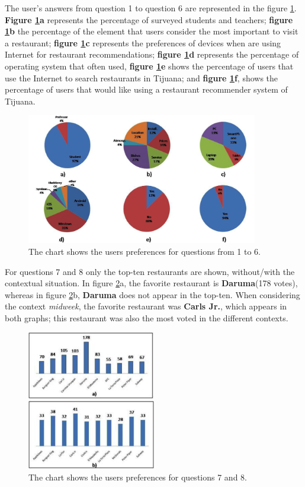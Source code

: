 The user's answers from question 1 to question 6 are represented in
the figure \ref{fig:cakeschart}. \textbf{Figure \ref{fig:cakeschart}a}
represents the percentage of surveyed students and teachers;
\textbf{figure \ref{fig:cakeschart}b}  the percentage of the element
that users consider the most important to visit a restaurant;
\textbf{figure \ref{fig:cakeschart}c} represents the preferences of
devices when are using Internet for restaurant recommendations;
\textbf{figure \ref{fig:cakeschart}d} represents the percentage of
operating system that often used, \textbf{figure
\ref{fig:cakeschart}e} shows the percentage of users that use the
Internet to search restaurants in Tijuana; and \textbf{figure
\ref{fig:cakeschart}f}, shows the percentage of users that would like
using a restaurant recommender system of Tijuana.
\begin{figure}
\captionsetup{justification=centering,margin=2cm}
\centering
\setlength\fboxsep{0pt}
\includegraphics[width=0.9\textwidth]{img/cakes.png}
\caption{The chart shows the users preferences for questions from 1 to 6.}
\label{fig:cakeschart}     
\end{figure}
For questions 7 and 8 only the top-ten restaurants are shown,
without/with the contextual situation. In figure \ref{fig:barschart}a,
the favorite restaurant is \textbf{Daruma}(178 votes),  whereas in
figure \ref{fig:barschart}b, \textbf{Daruma} does not appear in the
top-ten. When considering the context \textit{midweek}, the favorite
restaurant was \textbf{Carls Jr.}, which appears in both graphs; this
restaurant was also the most voted in the different contexts.
\begin{figure}
\captionsetup{justification=centering,margin=2cm}
\centering
\setlength\fboxsep{0pt}
\includegraphics[width=0.5\textwidth]{img/bars.png}
\caption{The chart shows the users preferences for questions 7 and 8.}
\label{fig:barschart}     
\end{figure}
